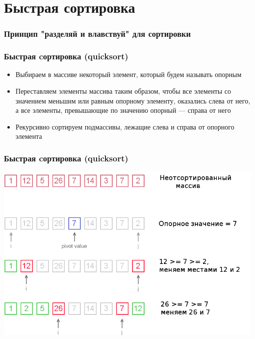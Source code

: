 \documentclass[12pt,pdf,hyperref={unicode}]{beamer}
\begin{document}
\section{Быстрая сортировка}


\begin{frame}[fragile]
\frametitle{Принцип "разделяй и влавствуй" для сортировки} 
\frametitle{Быстрая cортировка (quicksort)} 
\begin{itemize}
\item Выбираем в массиве некоторый элемент, который будем называть опорным \\
\item Переставляем элементы массива таким образом, чтобы все элементы со значением меньшим или равным опорному элементу, оказались слева от него, а все элементы, превышающие по значению опорный — справа от него \\
\item Рекурсивно сортируем подмассивы, лежащие слева и справа от опорного элемента\\
\end{itemize}
\end{frame}

\begin{frame}[fragile]
\frametitle{Быстрая cортировка (quicksort)} 
\begin{center}
\includegraphics[width=0.9\linewidth]{images/qs1.png}
\end{center}
\end{frame}
\end{document}
